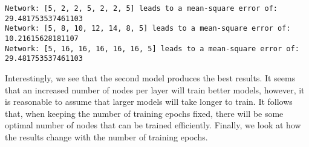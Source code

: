 \documentclass[11pt]{article}
\begin{document}
    \begin{Verbatim}[commandchars=\\\{\}]
Network: [5, 2, 2, 5, 2, 2, 5] leads to a mean-square error of: 29.481753537461103
Network: [5, 8, 10, 12, 14, 8, 5] leads to a mean-square error of: 10.21615628181107
Network: [5, 16, 16, 16, 16, 16, 5] leads to a mean-square error of: 29.481753537461103

    \end{Verbatim}

    Interestingly, we see that the second model produces the best results.
It seems that an increased number of nodes per layer will train better
models, however, it is reasonable to assume that larger models will take
longer to train. It follows that, when keeping the number of training
epochs fixed, there will be some optimal number of nodes that can be
trained efficiently. Finally, we look at how the results change with the
number of training epochs.
\end{document}
